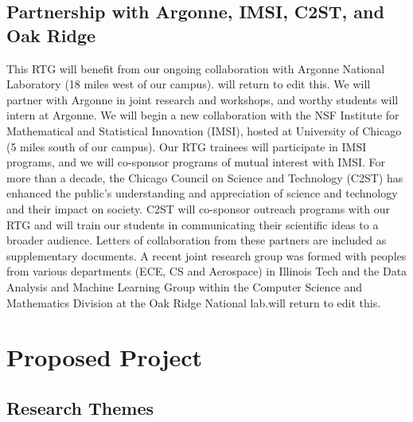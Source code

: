 \documentclass[11pt]{NSFamsart}
\begin{document}
\subsection*{Partnership with Argonne, IMSI, C2ST, and Oak Ridge}
This RTG will benefit from our ongoing collaboration with Argonne National Laboratory (18 miles west of our campus). 
{\color{magenta}will return to edit this.} We will partner with Argonne in joint research and workshops, and worthy students will intern at Argonne.  We will begin a new collaboration with the NSF Institute for Mathematical and Statistical Innovation (IMSI), hosted at University of Chicago (5 miles south of our campus). Our RTG trainees will participate in IMSI programs, and we will co-sponsor programs of mutual interest with IMSI.  For more than a decade, the Chicago Council on Science and Technology (C2ST) has enhanced the public’s understanding and appreciation of science and technology and their impact on society. C2ST will co-sponsor outreach programs with our RTG and will train our students in communicating their scientific ideas to a broader audience. Letters of collaboration from these partners are included as supplementary documents.  A recent joint research group was formed with peoples from various departments (ECE, CS and Aerospace) in Illinois Tech and the Data Analysis and Machine Learning Group within the Computer Science and Mathematics Division at the Oak Ridge National lab.{\color{magenta}will return to edit this.}
 


\section{Proposed Project } 
 

\subsection{Research Themes} \label{sec:researchproblems}
\end{document}
